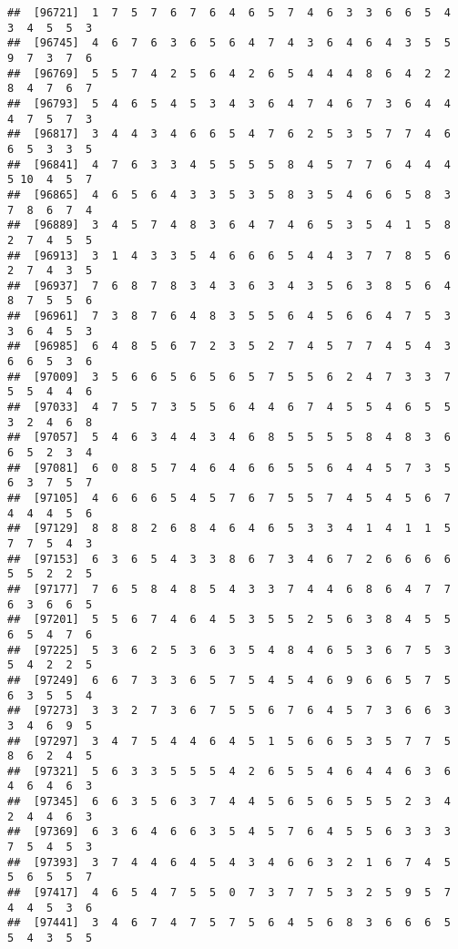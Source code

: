 \documentclass[
]{book}
\begin{document}
\begin{verbatim}
##  [96721]  1  7  5  7  6  7  6  4  6  5  7  4  6  3  3  6  6  5  4  3  4  5  5  3
##  [96745]  4  6  7  6  3  6  5  6  4  7  4  3  6  4  6  4  3  5  5  9  7  3  7  6
##  [96769]  5  5  7  4  2  5  6  4  2  6  5  4  4  4  8  6  4  2  2  8  4  7  6  7
##  [96793]  5  4  6  5  4  5  3  4  3  6  4  7  4  6  7  3  6  4  4  4  7  5  7  3
##  [96817]  3  4  4  3  4  6  6  5  4  7  6  2  5  3  5  7  7  4  6  6  5  3  3  5
##  [96841]  4  7  6  3  3  4  5  5  5  5  8  4  5  7  7  6  4  4  4  5 10  4  5  7
##  [96865]  4  6  5  6  4  3  3  5  3  5  8  3  5  4  6  6  5  8  3  7  8  6  7  4
##  [96889]  3  4  5  7  4  8  3  6  4  7  4  6  5  3  5  4  1  5  8  2  7  4  5  5
##  [96913]  3  1  4  3  3  5  4  6  6  6  5  4  4  3  7  7  8  5  6  2  7  4  3  5
##  [96937]  7  6  8  7  8  3  4  3  6  3  4  3  5  6  3  8  5  6  4  8  7  5  5  6
##  [96961]  7  3  8  7  6  4  8  3  5  5  6  4  5  6  6  4  7  5  3  3  6  4  5  3
##  [96985]  6  4  8  5  6  7  2  3  5  2  7  4  5  7  7  4  5  4  3  6  6  5  3  6
##  [97009]  3  5  6  6  5  6  5  6  5  7  5  5  6  2  4  7  3  3  7  5  5  4  4  6
##  [97033]  4  7  5  7  3  5  5  6  4  4  6  7  4  5  5  4  6  5  5  3  2  4  6  8
##  [97057]  5  4  6  3  4  4  3  4  6  8  5  5  5  5  8  4  8  3  6  6  5  2  3  4
##  [97081]  6  0  8  5  7  4  6  4  6  6  5  5  6  4  4  5  7  3  5  6  3  7  5  7
##  [97105]  4  6  6  6  5  4  5  7  6  7  5  5  7  4  5  4  5  6  7  4  4  4  5  6
##  [97129]  8  8  8  2  6  8  4  6  4  6  5  3  3  4  1  4  1  1  5  7  7  5  4  3
##  [97153]  6  3  6  5  4  3  3  8  6  7  3  4  6  7  2  6  6  6  6  5  5  2  2  5
##  [97177]  7  6  5  8  4  8  5  4  3  3  7  4  4  6  8  6  4  7  7  6  3  6  6  5
##  [97201]  5  5  6  7  4  6  4  5  3  5  5  2  5  6  3  8  4  5  5  6  5  4  7  6
##  [97225]  5  3  6  2  5  3  6  3  5  4  8  4  6  5  3  6  7  5  3  5  4  2  2  5
##  [97249]  6  6  7  3  3  6  5  7  5  4  5  4  6  9  6  6  5  7  5  6  3  5  5  4
##  [97273]  3  3  2  7  3  6  7  5  5  6  7  6  4  5  7  3  6  6  3  3  4  6  9  5
##  [97297]  3  4  7  5  4  4  6  4  5  1  5  6  6  5  3  5  7  7  5  8  6  2  4  5
##  [97321]  5  6  3  3  5  5  5  4  2  6  5  5  4  6  4  4  6  3  6  4  6  4  6  3
##  [97345]  6  6  3  5  6  3  7  4  4  5  6  5  6  5  5  5  2  3  4  2  4  4  6  3
##  [97369]  6  3  6  4  6  6  3  5  4  5  7  6  4  5  5  6  3  3  3  7  5  4  5  3
##  [97393]  3  7  4  4  6  4  5  4  3  4  6  6  3  2  1  6  7  4  5  5  6  5  5  7
##  [97417]  4  6  5  4  7  5  5  0  7  3  7  7  5  3  2  5  9  5  7  4  4  5  3  6
##  [97441]  3  4  6  7  4  7  5  7  5  6  4  5  6  8  3  6  6  6  5  5  4  3  5  5

\end{verbatim}
\end{document}
